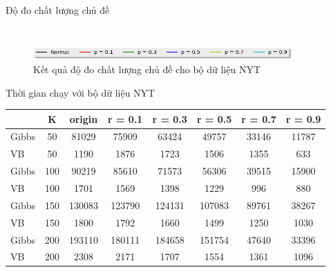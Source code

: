 \documentclass[pdf]{beamer}
\begin{document}
\begin{frame}{Độ đo chất lượng chủ đề }
\begin{columns}[T]
\begin{column}{.50\textwidth}
\begin{figure}
		\end{figure}				
	\end{column} %
\end{columns}
 \begin{figure}
	\begin{center}
		\captionsetup{justification=centering}
		\includegraphics[width=100mm]{menu.png}
		\caption{Kết quả độ đo chất lượng chủ đề cho bộ dữ liệu NYT}
	\end{center}
\end{figure}
\end{frame}


\begin{frame}{Thời gian chạy với bộ dữ liệu NYT}
\begin{tabular}{l|c |c | c | c | c | c | c }
		& K & origin & r = 0.1 & r = 0.3 & r = 0.5 & r = 0.7 & r = 0.9 \\
		\hline \hline
		Gibbs &50 & 81029& 75909 & 63424 & 49757 & 33146 & 11787 \\ 
		\hline
		VB &50 & 1190&  1876 & 1723 & 1506 &1355 & 633 \\
		\hline \hline
		Gibbs &100 &90219 & 85610 & 71573 & 56306 & 39515&  15900\\ 
		\hline
		VB &100 &1701 & 1569 & 1398 & 1229 &996 &880\\
		\hline \hline
		Gibbs &150 &130083 & 123790 & 124131 & 107083& 89761& 38267 \\ 
		\hline
		VB &150 &1800 & 1792 & 1660 & 1499 &1250 &1030\\
		\hline \hline
		Gibbs &200 & 193110& 180111 & 184658 & 151754 & 47640 & 33396 \\ 
		\hline
		VB &200 &2308 & 2171 & 1707 &  1554 & 1361&1096 \\
\end{tabular}
\end{frame}
\end{document}
